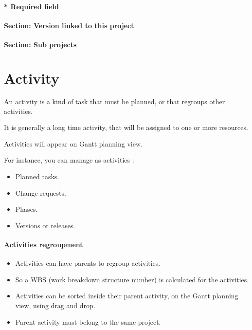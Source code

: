 \documentclass[letterpaper,10pt,english]{sphinxmanual}
\begin{document}
\textbf{* Required field}
\paragraph{Section: Version linked to this project}
\paragraph{Section: Sub projects}
\newpage
{}

\section{Activity}
\label{PlanningElements:pe-activity-label}\label{PlanningElements:index-1}\label{PlanningElements:activity}
An activity is a kind of task that must be planned, or that regroups other activities.

It is generally a long time activity, that will be assigned to one or more resources.

Activities will appear on Gantt planning view.

For instance, you can manage as activities :
\begin{itemize}
\item {} 
Planned tasks.

\item {} 
Change requests.

\item {} 
Phases.

\item {} 
Versions or releases.

\end{itemize}
\paragraph{Activities regroupment}
\begin{itemize}
\item {} 
Activities can have parents to regroup activities.

\item {} 
So a WBS (work breakdown structure number) is calculated for the activities.

\item {} 
Activities can be sorted inside their parent activity, on the Gantt planning view, using drag and drop.

\item {} 
Parent activity must belong to the same project.

\end{itemize}
\end{document}
